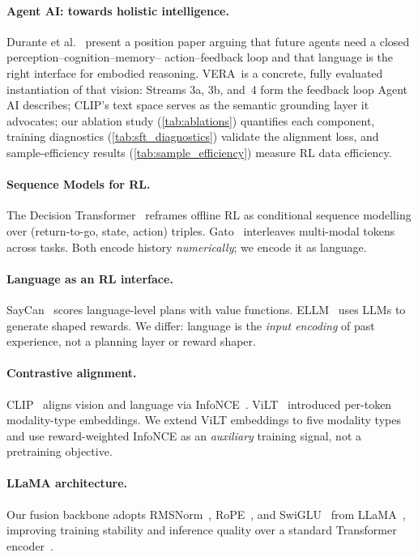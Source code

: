 \documentclass{article}
\newcommand{\modelname}{\textsc{VERA}\xspace}
\begin{document}
\paragraph{Agent AI: towards holistic intelligence.}
Durante et al.~\citep{durante2024agentai} present a position paper
arguing that future agents need a closed perception–cognition–memory–
action–feedback loop and that language is the right interface for
embodied reasoning.
\modelname\ is a concrete, fully evaluated instantiation of that vision:
Streams 3a, 3b, and~4 form the feedback loop Agent AI describes;
CLIP's text space serves as the semantic grounding layer it advocates;
our ablation study (\cref{tab:ablations}) quantifies each component,
training diagnostics (\cref{tab:sft_diagnostics}) validate the alignment
loss, and sample-efficiency results (\cref{tab:sample_efficiency}) measure
RL data efficiency.

\paragraph{Sequence Models for RL.}
The Decision Transformer~\citep{chen2021decision} reframes offline RL as
conditional sequence modelling over (return-to-go, state, action) triples.
Gato~\citep{reed2022gato} interleaves multi-modal tokens across tasks.
Both encode history \emph{numerically}; we encode it as language.

\paragraph{Language as an RL interface.}
SayCan~\citep{ahn2022saycan} scores language-level plans with value
functions.
ELLM~\citep{du2023ellm} uses LLMs to generate shaped rewards.
We differ: language is the \emph{input encoding} of past experience,
not a planning layer or reward shaper.

\paragraph{Contrastive alignment.}
CLIP~\citep{radford2021clip} aligns vision and language via
InfoNCE~\citep{oord2018infonce}.
ViLT~\citep{kim2021vilt} introduced per-token modality-type embeddings.
We extend ViLT embeddings to five modality types and use reward-weighted
InfoNCE as an \emph{auxiliary} training signal, not a pretraining objective.

\paragraph{LLaMA architecture.}
Our fusion backbone adopts RMSNorm~\citep{zhang2019rmsnorm},
RoPE~\citep{su2021rope}, and SwiGLU~\citep{shazeer2020swiglu} from
LLaMA~\citep{touvron2023llama}, improving training stability and
inference quality over a standard Transformer
encoder~\citep{vaswani2017attention}.
\end{document}
